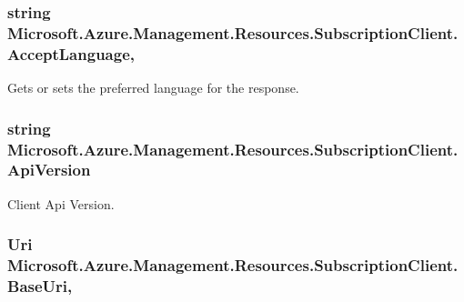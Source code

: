 \subsubsection[{\texorpdfstring{Accept\+Language}{AcceptLanguage}}]{\setlength{\rightskip}{0pt plus 5cm}string Microsoft.\+Azure.\+Management.\+Resources.\+Subscription\+Client.\+Accept\+Language\hspace{0.3cm}{\ttfamily [get]}, {\ttfamily [set]}}\hypertarget{class_microsoft_1_1_azure_1_1_management_1_1_resources_1_1_subscription_client_a655dec3210244f2c473a2e3201c30189}{}\label{class_microsoft_1_1_azure_1_1_management_1_1_resources_1_1_subscription_client_a655dec3210244f2c473a2e3201c30189}


Gets or sets the preferred language for the response. 

\subsubsection[{\texorpdfstring{Api\+Version}{ApiVersion}}]{\setlength{\rightskip}{0pt plus 5cm}string Microsoft.\+Azure.\+Management.\+Resources.\+Subscription\+Client.\+Api\+Version\hspace{0.3cm}{\ttfamily [get]}}\hypertarget{class_microsoft_1_1_azure_1_1_management_1_1_resources_1_1_subscription_client_abda07afb545fe259d63826a85960c528}{}\label{class_microsoft_1_1_azure_1_1_management_1_1_resources_1_1_subscription_client_abda07afb545fe259d63826a85960c528}


Client Api Version. 

\subsubsection[{\texorpdfstring{Base\+Uri}{BaseUri}}]{\setlength{\rightskip}{0pt plus 5cm}Uri Microsoft.\+Azure.\+Management.\+Resources.\+Subscription\+Client.\+Base\+Uri\hspace{0.3cm}{\ttfamily [get]}, {\ttfamily [set]}}\hypertarget{class_microsoft_1_1_azure_1_1_management_1_1_resources_1_1_subscription_client_ab5876848c2253cbe2f84f98b4e7571e2}{}\label{class_microsoft_1_1_azure_1_1_management_1_1_resources_1_1_subscription_client_ab5876848c2253cbe2f84f98b4e7571e2}


